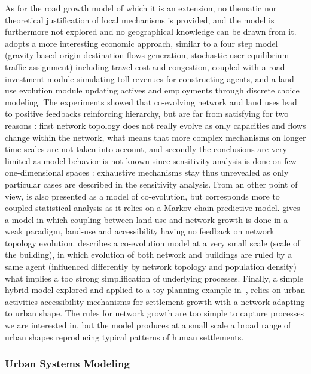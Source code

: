 As for the road growth model of which it is an extension, no thematic nor theoretical justification of local mechanisms is provided, and the model is furthermore not explored and no geographical knowledge can be drawn from it. \cite{levinson2007co} adopts a more interesting economic approach, similar to a four step model (gravity-based origin-destination flows generation, stochastic user equilibrium traffic assignment) including travel cost and congestion, coupled with a road investment module simulating toll revenues for constructing agents, and a land-use evolution module updating actives and employments through discrete choice modeling. The experiments showed that co-evolving network and land uses lead to positive feedbacks reinforcing hierarchy, but are far from satisfying for two reasons : first network topology does not really evolve as only capacities and flows change within the network, what means that more complex mechanisms on longer time scales are not taken into account, and secondly the conclusions are very limited as model behavior is not known since sensitivity analysis is done on few one-dimensional spaces : exhaustive mechanisms stay thus unrevealed as only particular cases are described in the sensitivity analysis. From an other point of view, \cite{levinson2005paving} is also presented as a model of co-evolution, but corresponds more to coupled statistical analysis as it relies on a Markov-chain predictive model. \cite{rui2011urban} gives a model in which coupling between land-use and network growth is done in a weak paradigm, land-use and accessibility having no feedback on network topology evolution. \cite{achibet2014model} describes a co-evolution model at a very small scale (scale of the building), in which evolution of both network and buildings are ruled by a same agent (influenced differently by network topology and population density) what implies a too strong simplification of underlying processes. Finally, a simple hybrid model explored and applied to a toy planning example in~\cite{raimbault2014hybrid}, relies on urban activities accessibility mechanisms for settlement growth with a network adapting to urban shape. The rules for network growth are too simple to capture processes we are interested in, but the model produces at a small scale a broad range of urban shapes reproducing typical patterns of human settlements.


\subsubsection{Urban Systems Modeling}

